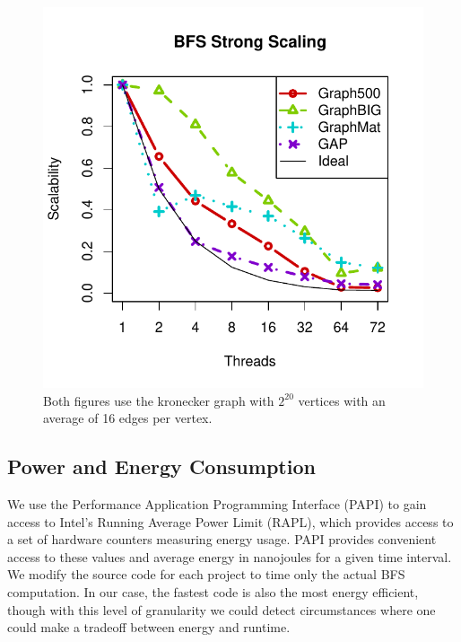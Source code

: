 \documentclass{llncs}
\begin{document}
\begin{figure}
\begin{minipage}{0.425\linewidth}
		\includegraphics[width=\linewidth, trim=0 18pt 18pt 0, clip]{graphics/bfs_ss.pdf}
	\end{minipage}
	\caption{Both figures use the kronecker graph with $2^{20}$ vertices with an average of 16 edges per vertex.}
	\label{fig:bfs-scaling}
\end{figure}

\subsection{Power and Energy Consumption}
We use the Performance Application Programming Interface (PAPI) \cite{Browne:2000:PAPI} to gain access to Intel's Running Average Power Limit (RAPL), which provides access to a set of hardware counters measuring energy usage. PAPI provides convenient access to these values and average energy in nanojoules for a given time interval. We modify the source code for each project to time only the actual BFS computation. In our case, the fastest code is also the most energy efficient, though with this level of granularity we could detect circumstances where one could make a tradeoff between energy and runtime.
\end{document}
